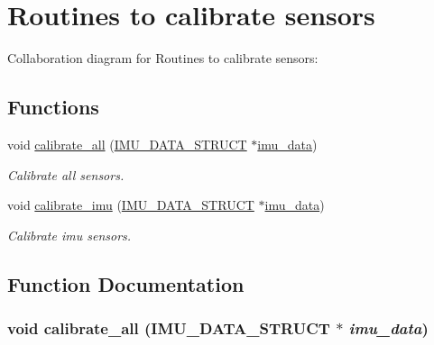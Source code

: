 \hypertarget{group__calibrate}{
\section{Routines to calibrate sensors}
\label{group__calibrate}
}


Collaboration diagram for Routines to calibrate sensors:

\subsection*{Functions}
\begin{DoxyCompactItemize}
\item 
void \hyperlink{group__calibrate_ga043045246cf217758281222214c4addc}{calibrate\_\-all} (\hyperlink{structIMU__DATA__STRUCT}{IMU\_\-DATA\_\-STRUCT} $\ast$\hyperlink{threads__linux_8c_a3cfea12cbe9ca7f1681c950e4cd68606}{imu\_\-data})
\begin{DoxyCompactList}\small\item\em Calibrate all sensors. \item\end{DoxyCompactList}\item 
void \hyperlink{group__calibrate_gaecfc81d152db2843b5d1517729804d63}{calibrate\_\-imu} (\hyperlink{structIMU__DATA__STRUCT}{IMU\_\-DATA\_\-STRUCT} $\ast$\hyperlink{threads__linux_8c_a3cfea12cbe9ca7f1681c950e4cd68606}{imu\_\-data})
\begin{DoxyCompactList}\small\item\em Calibrate imu sensors. \item\end{DoxyCompactList}\end{DoxyCompactItemize}


\subsection{Function Documentation}
\hypertarget{group__calibrate_ga043045246cf217758281222214c4addc}{
\subsubsection[{calibrate\_\-all}]{\setlength{\rightskip}{0pt plus 5cm}void calibrate\_\-all ({\bf IMU\_\-DATA\_\-STRUCT} $\ast$ {\em imu\_\-data})}}
\label{group__calibrate_ga043045246cf217758281222214c4addc}


